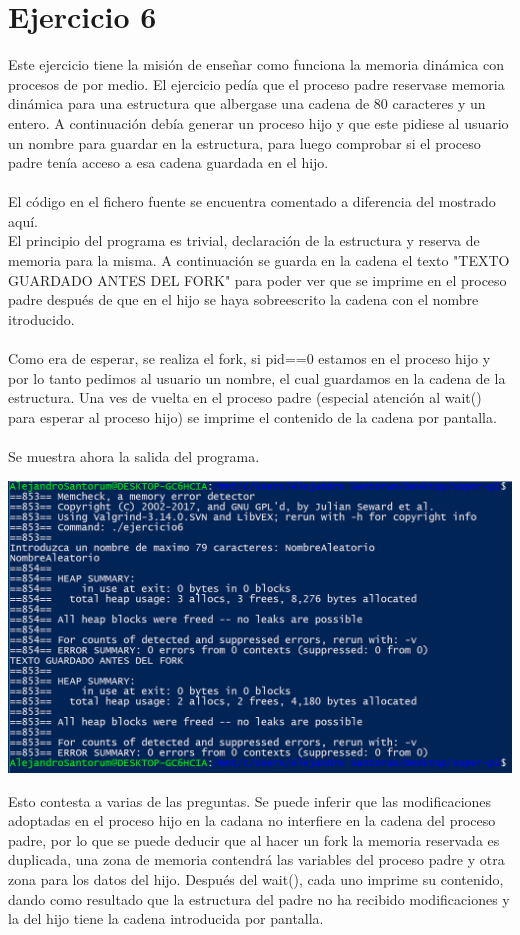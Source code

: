 \documentclass[12pt]{article}
\begin{document}
\section{Ejercicio 6}
Este ejercicio tiene la misión de enseñar como funciona la memoria dinámica con procesos de por medio. El ejercicio pedía que el proceso padre reservase memoria dinámica para una estructura que albergase una cadena de 80 caracteres y un entero. A continuación debía generar un proceso hijo y que este pidiese al usuario un nombre para guardar en la estructura, para luego comprobar si el proceso padre tenía acceso a esa cadena guardada en el hijo.\\\\
El código en el fichero fuente se encuentra comentado a diferencia del mostrado aquí.\\El principio del programa es trivial, declaración de la estructura y reserva de memoria para la misma. A continuación se guarda en la cadena el texto "TEXTO GUARDADO ANTES DEL FORK" para poder ver que se imprime en el proceso padre después de que en el hijo se haya sobreescrito la cadena con el nombre itroducido.\\\\
Como era de esperar, se realiza el fork, si pid==0 estamos en el proceso hijo y por lo tanto pedimos al usuario un nombre, el cual guardamos en la cadena de la estructura. Una ves de vuelta en el proceso padre (especial atención al wait() para esperar al proceso hijo) se imprime el contenido de la cadena por pantalla.\\\\
Se muestra ahora la salida del programa.
\begin{center}
	\includegraphics[scale=1]{ej6.PNG}
\end{center}
Esto contesta a varias de las preguntas. Se puede inferir que las modificaciones adoptadas en el proceso hijo en la cadana no interfiere en la cadena del proceso padre, por lo que se puede deducir que al hacer un fork la memoria reservada es duplicada, una zona de memoria contendrá las variables del proceso padre y otra zona para los datos del hijo. Después del wait(), cada uno imprime su contenido, dando como resultado que la estructura del padre no ha recibido modificaciones y la del hijo tiene la cadena introducida por pantalla.\\\\
\end{document}
